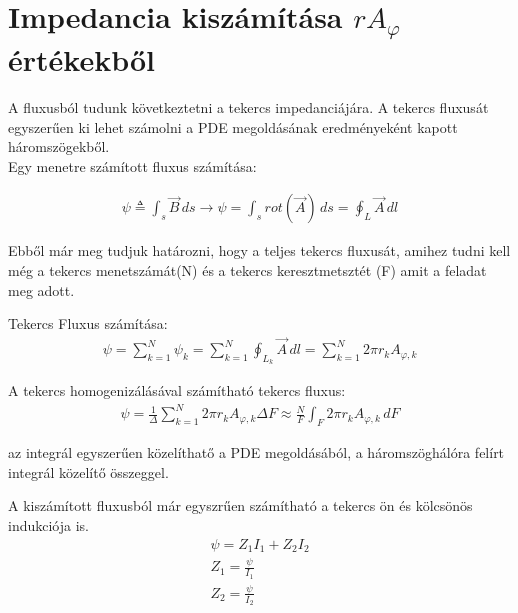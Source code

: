 \section{Impedancia kiszámítása $rA_{\varphi}$ értékekből}


A fluxusból tudunk következtetni a tekercs impedanciájára. A tekercs fluxusát
egyszerűen ki lehet számolni a PDE megoldásának eredményeként kapott háromszögekből.\\

Egy menetre számított fluxus számítása:

\begin{align}
    \psi \triangleq \int_{s}^{}  \vec{B} \,ds
    \rightarrow  \psi = \int_{s} rot(\vec{A}) \,ds
    = \oint_L \vec{A} \,dl
\end{align}

Ebből már meg tudjuk határozni, hogy a teljes tekercs fluxusát, amihez tudni kell még a
tekercs menetszámát(N) és a tekercs keresztmetsztét (F) amit a feladat meg adott.

Tekercs Fluxus számítása:
\begin{align}
    \psi = \sum_{k = 1}^{N}  \psi_k = \sum_{k = 1}^{N} \oint_{L_k} \vec{A} \,dl
    = \sum_{k = 1}^{N} 2 \pi r_k A_{\varphi,k}
\end{align}

A tekercs homogenizálásával számítható tekercs fluxus:
\begin{align}
    \psi = \frac{1}{\Delta} \sum_{k=1}^N  2 \pi r_k A_{\varphi,k} \Delta F \approx
    \frac{N}{F} \int_{F} 2 \pi r_k A_{\varphi,k} \,dF
\end{align}

az integrál egyszerűen közelíthatő a PDE megoldásából, a háromszöghálóra felírt
integrál közelítő összeggel.

A kiszámított fluxusból már egyszrűen számítható a tekercs ön és kölcsönös indukciója is.
\begin{align}
    \psi = Z_1 I_1 + Z_2 I_2 \\
    Z_1 = \frac{\psi}{I_1}   \\
    Z_2 = \frac{\psi}{I_2}
\end{align}

